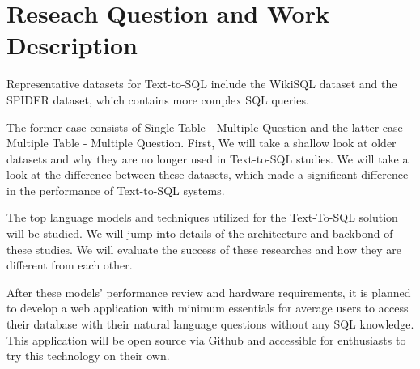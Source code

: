 \section{Reseach Question and Work Description}

Representative datasets for Text-to-SQL include the WikiSQL\cite{zhong_seq2sql_2017} dataset and
the SPIDER\cite{yu_spider_2019} dataset, which contains more complex SQL queries.

The former case consists of Single Table - Multiple Question and the latter case Multiple Table - Multiple Question.
First, We will take a shallow look at older datasets and why they are no longer used in Text-to-SQL studies.
We will take a look at the difference between these datasets, which made a significant difference in the performance of Text-to-SQL systems.

The top language models and techniques utilized for the Text-To-SQL solution will be studied. We will jump into details of the architecture and backbond of these studies. We will evaluate the success of these researches and how they are different from each other.

After these models' performance review and hardware requirements, it is planned to develop a web application with minimum essentials for average users to access their database with their natural language questions without any SQL knowledge. This application will be open source via Github and accessible for enthusiasts to try this technology on their own.
